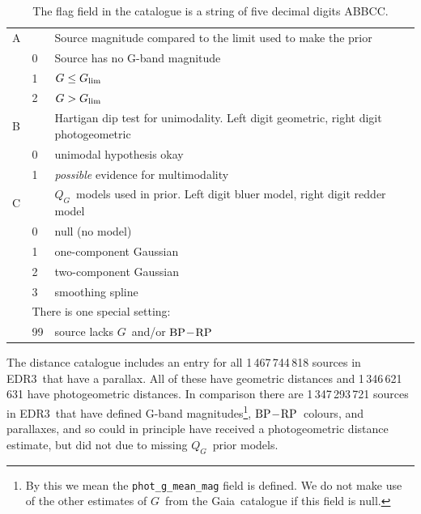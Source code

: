 \documentclass[twocolumn]{aastex62}
\providecommand{\gaia}{Gaia}
\providecommand{\release}{EDR3}
\providecommand{\gmag}{\ensuremath{G}}
\providecommand{\QG}{\ensuremath{Q_G}}
\providecommand{\bprp}{\ensuremath{{\rm BP} \! - \! {\rm RP}}}
\begin{document}
\begin{table}
\begin{center}
\caption{The flag field in the catalogue is a string of five decimal digits ABBCC.
\label{tab:flag}
}
\begin{tabular}{llp{}}
\hline
A    &     &  Source magnitude compared to the limit used to make the prior \\
      &  0  &  Source has no G-band magnitude \\
      &  1  &  $\gmag \leq \gmag_{\rm lim}$ \\
      &  2  &  $\gmag > \gmag_{\rm lim}$ \\
\hline
B   &     &  Hartigan dip test for unimodality. 
                  Left digit geometric, right digit photogeometric \\
     &  0  &  unimodal hypothesis okay\\
     &  1  & {\em possible} evidence for multimodality\\
\hline
C   &     &  \QG\ models used in prior. 
                Left digit bluer model, right digit redder model \\
     &  0  &  null (no model)\\
     &  1  &  one-component Gaussian\\
     &  2  &  two-component Gaussian\\
     &  3  &  smoothing spline\\
     & \multicolumn{2}{l}{There is one special setting:} \\
     & 99 & source lacks \gmag\ and/or \bprp \\
\hline
\end{tabular}
\end{center}
\end{table}

The distance catalogue includes an entry for all
1\,467\,744\,818 sources in \release\ that have a parallax.
All of these have geometric distances and 
1\,346\,621\,631 have photogeometric distances.
In comparison there are 1\,347\,293\,721 sources in \release\ that have defined G-band magnitudes\footnote{By this we mean the {\tt phot\_g\_mean\_mag} field is defined. We do not make use of the other estimates of \gmag\ from the \gaia\ catalogue if this field is null.}, \bprp\ colours, and parallaxes, and so could in principle have received a photogeometric distance estimate, but did not due to missing \QG\ prior models. 
\end{document}
